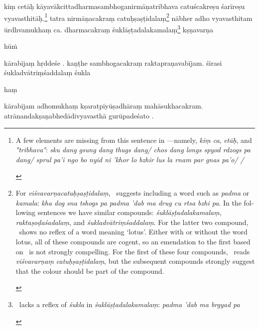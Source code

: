 \documentclass[naipra.tex]{subfiles}
\begin{document}
\begin{sanskrit}
\pstart
kiṃ cetāḥ kāyavākcittadharmasambhoganirmāṇatribhava catuścakreṣu śarīreṣu vyavasthitāḥ.\footnote{
	\begin{english}%
		A few elements are missing from this sentence in \TIB —namely, \emph{kiṃ ca}, \emph{etāḥ}, and \emph{°tribhava°}: \emph{sku dang gsung dang thugs dang/ chos dang longs spyod rdzogs pa dang/ sprul pa’i ngo bo nyid ni ’khor lo bzhir lus la rnam par gnas pa’o/ /}
	\end{english}
}
tatra nirmāṇacakraṃ catuḥṣaṣṭidalaṃ\footnote{
	\begin{english}%
		For \emph{viśvavarṇacatuḥṣaṣṭidalaṃ}, \TIB\ suggests including a word such as \emph{padma} or \emph{kamala}: \emph{kha dog sna tshogs pa padma 'dab ma drug cu rtsa bzhi pa}.
		In the following sentences we have similar compounds: \emph{śuklāṣṭadalakamalaṃ}, \emph{raktaṣoḍaśadalaṃ}, and \emph{śukladvātriṃśaddalaṃ}. 
		For the latter two compound, \TIB\ shows no reflex of a word meaning `lotus'.
		Either with or without the word lotus, all of these compounds are cogent, so an emendation to the first based on \TIB\ is not strongly compelling.
		For the first of these four compounds, \MSN\ reads \emph{viśvavarṇaṃ catuḥṣaṣṭidalaṃ}, but the subsequent compounds strongly suggest that the colour should be part of the compound.
	\end{english}
}
  nābher adho vyavasthitam ūrdhvamukhaṃ ca.%
dharmacakraṃ śuklāṣṭadalakamalaṃ\footnote{
	\begin{english}%
		\TIB\ lacks a reflex of \emph{śukla} in \emph{śuklāṣṭadalakamalaṃ}: \emph{padma 'dab ma brgyad pa} 
	\end{english}
} kṣṇavarṇa\dsh \begin{mantra}hūṁ\end{mantra}\dsh kārabījaṃ hṛddeśe . 
kaṇṭhe sambhogacakraṃ  raktapraṇavabījam.
śirasi śukladvātriṃśaddalaṃ śukla\dsh \begin{mantra}haṃ\end{mantra}\dsh kārabījam adhomukhaṃ kṣaratpīyūṣadhāraṃ mahāsukhacakram. 
atrānandakṣaṇabhedādivyavasthā gurūpadeśato .
\pend


\end{sanskrit}
\end{document}
